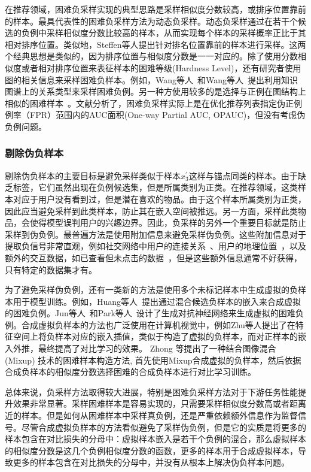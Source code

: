 在推荐领域，困难负采样实现的典型思路是采样相似度分数较高，或排序位置靠前的样本。最具代表性的困难负采样方法为动态负采样\cite{Zhang:2013:SIGIR}。动态负采样通过在若干个候选的负例中采样相似度分数比较高的样本，从而实现每个样本的采样概率正比于其相对排序位置。类似地，Steffen等人\cite{Steffen:2014:WSDM}提出针对排名位置靠前的样本进行采样。这两个经典思想是类似的，因为排序位置与相似度分数是一一对应的。除了使用分数相似度或者相对排序位置来表征样本的困难等级(Hardness Level)，还有研究者使用图的相关信息来采样困难负样本。例如，Wang等人~\cite{Wang:2020:WWW}和Wang等人~\cite{Wang:2021:CIKM}提出利用知识图谱上的关系类型来采样困难负例。另一种方使用较多的是选择与正例在图结构上相似的困难样本~\cite{Chen:2019:WWW,Wang:2021:TKDE,Ying:2018:KDD}。文献\cite{shi2023theories}分析了，困难负采样实际上是在优化推荐列表指定伪正例例率（FPR）范围内的AUC面积(One-way Partial AUC, OPAUC)，但没有考虑伪负例问题。

\subsubsection{剔除伪负样本}
剔除伪负样本的主要目标是避免采样类似于样本$x_3^\prime$这样与锚点同类的样本。由于缺乏标签，它们虽然出现在负例候选集，但是所属类别为正类。在推荐领域，这类样本对应于用户没有看到过，但是潜在喜欢的物品。由于这个样本所属类别为正类，因此应当避免采样到此类样本，防止其在嵌入空间被推远。另一方面，采样此类物品，会使得模型误判用户的兴趣边界。因此，负采样的另外一个重要目标就是防止采样到伪负例。最普遍方法是使用附加信息来避免采样伪负例。这些附加信息对于提取负信号非常直观，例如社交网络中用户的连接关系~\cite{Zhao:2014:CIKM,Wang:2016:CIKM}、用户的地理位置~\cite{Yuan:2016:IJCAI,Liu:2019:IJCAI}，以及额外的交互数据，如已查看但未点击的数据~\cite{Jingtao:2019:IJCAI, Jingtao:2018:WWW}，但是这些额外信息通常不好获得，只有特定的数据集才有。

为了避免采样伪负例，还有一类新的方法是使用多个未标记样本中生成虚拟的负样本用于模型训练。例如，Huang等人~\cite{Huang:2021:KDD}提出通过混合候选负样本的嵌入来合成虚拟的困难负例。Jun等人~\cite{Jun:2017:SIGIR}和Park等人~\cite{Park:2019:WWW}设计了生成对抗神经网络来生成虚拟的困难负例。合成虚拟负样本的方法也广泛使用在计算机视觉中，例如Zhu等人\cite{zhu:2021:iccv}提出了在特征空间上将负样本对应的嵌入插值，类似于构造了虚拟的负样本，而对正样本的嵌入外推，最终提高了对比学习的效果。 Zhong 等\cite{zhong:2021:cvpr}提出了一种结合图像混合 (Mixup) 技术的困难样本构造方法, 首先使用Mixup合成虚拟的负样本，然后依据合成负样本的相似度分数选择困难的合成负样本进行对比学习训练。

总体来说，负采样方法取得较大进展，特别是困难负采样方法对于下游任务性能提升效果非常显著。采样困难样本是容易实现的，只需要采样相似度分数高或者距离近的样本。但是如何从困难样本中采样真负例，还是严重依赖额外信息作为监督信号。尽管合成虚拟负样本的方法看似避免了采样伪负例，但是它的实质是将更多的样本包含在对比损失的分母中：虚拟样本嵌入是若干个负例的混合，那么虚拟样本的相似度分数是这几个负例相似度分数的函数，更多的样本用于合成虚拟样本，导致更多的样本包含在对比损失的分母中，并没有从根本上解决伪负样本问题。
